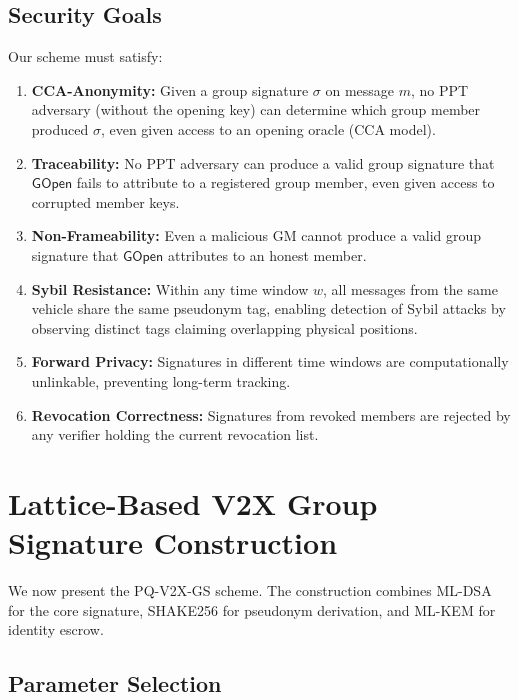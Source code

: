 \documentclass[conference,10pt]{IEEEtran}
\newcommand{\shake}{\textsf{SHAKE256}}
\begin{document}
\subsection{Security Goals}

Our scheme must satisfy:

\begin{enumerate}
    \item \textbf{CCA-Anonymity:} Given a group signature $\sigma$ on message $m$, no PPT adversary (without the opening key) can determine which group member produced $\sigma$, even given access to an opening oracle (CCA model).

    \item \textbf{Traceability:} No PPT adversary can produce a valid group signature that $\mathsf{GOpen}$ fails to attribute to a registered group member, even given access to corrupted member keys.

    \item \textbf{Non-Frameability:} Even a malicious GM cannot produce a valid group signature that $\mathsf{GOpen}$ attributes to an honest member.

    \item \textbf{Sybil Resistance:} Within any time window $w$, all messages from the same vehicle share the same pseudonym tag, enabling detection of Sybil attacks by observing distinct tags claiming overlapping physical positions.

    \item \textbf{Forward Privacy:} Signatures in different time windows are computationally unlinkable, preventing long-term tracking.

    \item \textbf{Revocation Correctness:} Signatures from revoked members are rejected by any verifier holding the current revocation list.
\end{enumerate}

\section{Lattice-Based V2X Group Signature Construction}
\label{sec:construction}

We now present the \textsc{PQ-V2X-GS} scheme. The construction combines ML-DSA for the core signature, \shake{} for pseudonym derivation, and ML-KEM for identity escrow.

\subsection{Parameter Selection}
\end{document}
